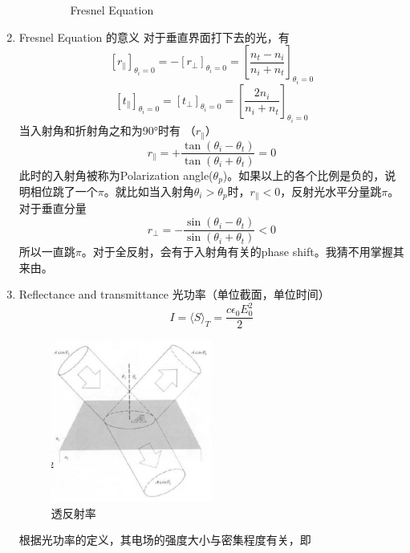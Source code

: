 \documentclass{ctexart}
\begin{document}
\begin{enumerate}
\begin{enumerate}
\begin{figure}
\caption{Fresnel Equation}
\end{figure}
\end{enumerate}
\item Fresnel Equation 的意义
对于垂直界面打下去的光，有
\begin{equation}
\left[r_{\|}\right]_{\theta_{i}=0}=-\left[r_{\perp}\right]_{\theta_{i}=0}=\left[\frac{n_{t}-n_{i}}{n_{i}+n_{t}}\right]_{\theta_{i}=0}
\end{equation}
\begin{equation}
\left[t_{\|}\right]_{\theta_{i}=0}=\left[t_{\perp}\right]_{\theta_{i}=0}=\left[\frac{2 n_{i}}{n_{i}+n_{t}}\right]_{\theta_{i}=0}
\end{equation}
当入射角和折射角之和为90°时有 （$r_{\|}$）
\begin{equation}
r_{\|}=+\frac{\tan \left(\theta_{i}-\theta_{t}\right)}{\tan \left(\theta_{i}+\theta_{t}\right)}=0
\end{equation}
此时的入射角被称为Polarization angle($\theta_p$)。如果以上的各个比例是负的，说明相位跳了一个$\pi$。就比如当入射角$\theta_i>\theta_p$时，$r_{\|}<0$，反射光水平分量跳$\pi$。对于垂直分量\begin{equation}
r_{\perp}=-\frac{\sin \left(\theta_{i}-\theta_{t}\right)}{\sin \left(\theta_{i}+\theta_{t}\right)}<0
\end{equation}
所以一直跳$\pi$。对于全反射，会有于入射角有关的phase shift。我猜不用掌握其来由。
\item Reflectance and transmittance 
光功率（单位截面，单位时间）
\begin{equation}
I=\langle S \rangle_{T}=\frac{c \epsilon_{0} E_{0}^{2}}{2}
\end{equation}
\begin{figure}
\center
\includegraphics[width=0.5\textwidth]{透反射率.png}
\caption{透反射率}
\end{figure}
根据光功率的定义，其电场的强度大小与密集程度有关，即

\end{enumerate}
\end{document}
